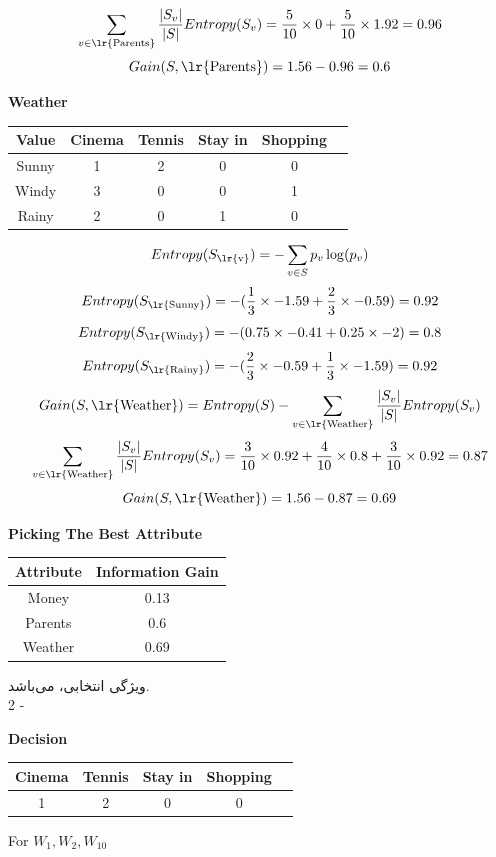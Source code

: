 \documentclass{article}
\newcommand{\tf}[1]{\text{\lr{#1}}}
\begin{document}
	\[
	\sum_{v \in \tf{Parents}} \frac{| S_v |}{| S |}Entropy(S_v) = \frac{5}{10} \times 0 + \frac{5}{10} \times 1.92 = 0.96
	\]
	\[
	Gain(S, \tf{Parents}) = 1.56 - 0.96 = 0.6
	\]
	\begin{latin}
		\textbf{Weather}
		\begin{center}
			\begin{tabular}{|c|c|c|c|c|c|}
				\hline
				Value & Cinema & Tennis & Stay in & Shopping\\
				\hline
				\hline
				Sunny & ‌1& 2 & 0 & 0\\
				\hline
				Windy & 3 & 0 & 0 & 1\\
				\hline
				Rainy & 2 & 0 & 1 & 0\\
				\hline
			\end{tabular}
		\end{center}
	\end{latin}
	\vspace{5pt}
	\[
	Entropy(S_{\tf{v}}) = -\sum_{v \in S} p_v\log (p_v)
	\]
	\[
	Entropy(S_{\tf{Sunny}}) = -(\frac{1}{3} \times -1.59 + \frac{2}{3} \times -0.59) = 0.92
	\]
	\[
	Entropy(S_{\tf{Windy}}) = -(0.75 \times -0.41 + 0.25 \times -2) = 0.8
	\]
	\[
	Entropy(S_{\tf{Rainy}}) = -(\frac{2}{3} \times -0.59 + \frac{1}{3} \times -1.59) = 0.92
	\]
	\vspace{10pt}
	\[
	Gain(S, \tf{Weather}) = Entropy(S) - \sum_{v \in \tf{Weather}} \frac{| S_v |}{| S |}Entropy(S_v)
	\] 
	\[
	\sum_{v \in \tf{Weather}} \frac{| S_v |}{| S |}Entropy(S_v) = \frac{3}{10} \times 0.92 + \frac{4}{10} \times 0.8 + \frac{3}{10} \times 0.92 = 0.87
	\]
	\[
	Gain(S, \tf{Weather}) = 1.56 - 0.87 = 0.69
	\]
	\newpage
	\begin{latin}
		\textbf{Picking The Best Attribute}
		\begin{center}
			\begin{tabular}{|c|c|}
				\hline
				Attribute & Information Gain\\
				\hline
				\hline
				Money & 0.13\\
				Parents & 0.6\\
				Weather & 0.69\\
				\hline
			\end{tabular}
		\end{center}
	\end{latin}
	ویژگی انتخابی،
	می‌باشد.\\
	2 - 
	\begin{latin}
		\textbf{Decision}
		\begin{center}
			\begin{tabular}{|c|c|c|c|c|}
				\hline
				Cinema & Tennis & Stay in & Shopping\\
				\hline
				\hline
				1 & 2 & 0 & 0\\
				\hline
			\end{tabular}
		\end{center}
		For $W_1, W_2, W_{10}$
	\end{latin}
\end{document}
